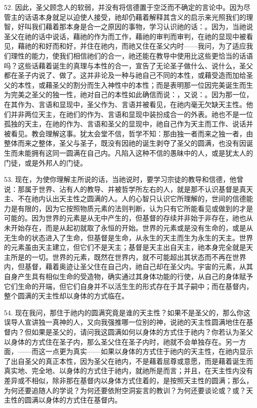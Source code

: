 52. 因此，圣父顾念人的软弱，并没有将信德置于空泛而不确定的言论中。因为尽管主的话语本身就足以迫使人接受，祂却仍藉着解释其含义的启示来光照我们的理智，好叫我们藉着那本身是合一之原因的事物，学习认识祂的话：。因为，当祂说圣父在祂的话中说话，藉祂的作为而工作，藉祂的审判而审判，在祂的显现中被看见，藉祂的和好而和好，并住在祂内，而祂又住在圣父内时——我问，为了适应我们理性的能力，使我们相信祂们的合一，祂还能在教导中使用比这些更恰当的话语吗？这些话藉着诞生的真理与本性的合一，宣告了无论圣子做什么、说什么，圣父都在圣子内说了、做了。这并非论及一种与祂自己不同的本性，或藉受造而加给圣父的本性，或藉圣父的割分而生入神性中的本性；而是表明那一位因完美诞生而生为完美之圣父的独一性，祂对自己的本性如此确信而说：，又说：。因为那一位，在其作为、言语和显现中，圣父作为、言语并被看见，在祂内毫无欠缺天主性。他们并非两位天主，在祂们的作为、言语和显现中装扮成合一的外表。祂也不是一位孤独的天主，在祂的作为、言语和圣父的显现中，祂自己作为天主而工作、说话并被看见。教会理解这事。犹太会堂不信，哲学不知：那由独一者而来之独一者，由整体而来之整体，圣父与圣子，既没有因祂的诞生剥夺了圣父的圆满，也没有因诞生而未能拥有这同一圆满在自己内。凡陷入这种不信的愚昧中的人，或是犹太人的门徒，或是外邦人的门徒。\par

53. 现在，为使你理解主所说的话，当祂说时，要学习宗徒的教导和信德，他曾说：那属于世界、沾有人的教导、并被哲学所左右的人，就是那不认识基督是真天主、不在祂内认出天主性之圆满的人。人的心智只认识它所理解的，世间的信德能力是有限的，因为它按照物质元素的法则判断，认为只有它所能看见或做到的才是可能的。因为世界的元素是从无中产生的，但基督的存续并非始于非存在，祂也从未开始存在，而是从起初就取了永恒的开始。世界的元素或是没有生命的，或是从无生命的状态进入了生命，但基督是生命，从永生的天主而生为永生的天主。世界的元素虽由天主建立，但它们不是天主；基督是天主出自天主，祂本身完全就是天主所是的一切。世界的元素，既然在世界内，就不可能超出其状态而不再在世界内，但基督，藉着奥迹让圣父住在自己内，祂自己却在圣父内。宇宙的元素，从其自身产生具有相似生命的受造物，确实通过其身体功能的行使，从自己的身体赋予它们生命的开端，但它们自身并不以活生生的形式存在于其子嗣中；而在基督内，整个圆满的天主性却以身体的方式临在。\par

54. 现在我问，那住于祂内的圆满究竟是谁的天主性？如果不是圣父的，那么你这误导人宣讲独一真神的人，又向我强推哪一位别的神，说祂的天主性圆满地住在基督内？但如果是圣父的，请问我这圆满如何以身体的方式住于祂内？你若认为圣父以身体的方式住在圣子内，那么圣父住在圣子内时，祂就不会单独存在。另一方面，——而这一点更为真实——如果以身体的方式住于祂内的天主性，在祂内显示了出自圣父的真正本性，因为圣父在祂内，不是藉着屈尊或意愿，而是藉着诞生而真实地、完全地、以身体的方式住于祂内，就祂所是而言；并且，在天主性内没有差异或不相似，除非那在基督内以身体方式住着的，是按照天主性的圆满；那么，为何还要追随人的学说？为何还要依附空洞妄言的教训？为何还要谈论或？或？天主性的圆满以身体的方式住在基督内。\par


